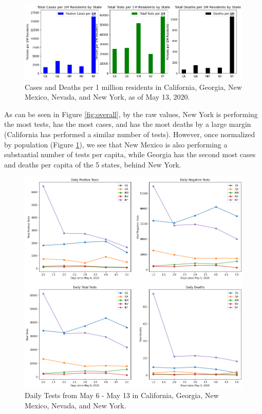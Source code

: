 \documentclass[11pt]{article}
\begin{document}
\FloatBarrier
\begin{figure}[h]
    \centering
    \includegraphics[width=\linewidth]{diagrams/analysis/total_cases_capita_bar.png}
    \caption{Cases and Deaths per 1 million residents in California, Georgia, New Mexico, Nevada, and New York, as of May 13, 2020.}
    \label{fig:capita}
\end{figure}
\FloatBarrier

\noindent
As can be seen in Figure \ref{fig:overall}, by the raw values, New York is performing the most tests, has the most cases, and has the most deaths by a large margin (California has performed a similar number of tests). However, once normalized by population (Figure \ref{fig:capita}), we see that New Mexico is also performing a substantial number of tests per capita, while Georgia has the second most cases and deaths per capita of the 5 states, behind New York.

\pagebreak

\FloatBarrier
\begin{figure}[h]
    \centering
    \includegraphics[width=\linewidth]{diagrams/analysis/daily_tests.png}
    \caption{Daily Tests from May 6 - May 13 in California, Georgia, New Mexico, Nevada, and New York.}
    \label{fig:dailytests}
\end{figure}
\FloatBarrier
\end{document}
